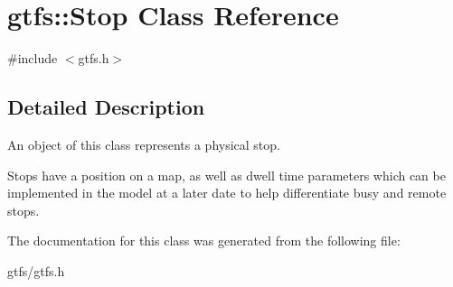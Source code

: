 \hypertarget{classgtfs_1_1Stop}{}\section{gtfs\+:\+:Stop Class Reference}
\label{classgtfs_1_1Stop}


{\ttfamily \#include $<$gtfs.\+h$>$}



\subsection{Detailed Description}
An object of this class represents a physical stop.

Stops have a position on a map, as well as dwell time parameters which can be implemented in the model at a later date to help differentiate busy and remote stops. 

The documentation for this class was generated from the following file\+:\begin{DoxyCompactItemize}
\item 
gtfs/gtfs.\+h\end{DoxyCompactItemize}
